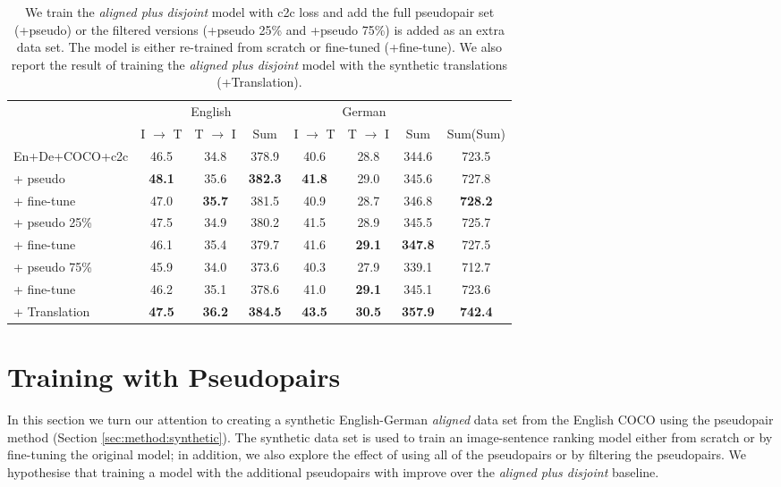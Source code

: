 \begin{table*}[ht]
    \centering
    \renewcommand{\arraystretch}{1.0}
    	\footnotesize
    \begin{tabular}{lccccccc}
        \toprule
         & \multicolumn{3}{c}{English}  & \multicolumn{3}{c}{German}\\
         \cmidrule(lr){2-4} \cmidrule(lr){5-7}
         & I $\rightarrow$ T & T $\rightarrow$ I & Sum 
         & I $\rightarrow$ T & T $\rightarrow$ I & Sum & Sum(Sum)\\
         \midrule
         En+De+COCO+c2c & 46.5 & 34.8 & 378.9 & 40.6 & 28.8 & 344.6 & 723.5\\
         \: \: + pseudo & \textbf{48.1}  & 35.6 & \textbf{382.3} & \textbf{41.8}  & 29.0  & 345.6 & 727.8 \\
          \: \: \: + fine-tune & 47.0 & \textbf{35.7}  & 381.5  & 40.9  & 28.7 & 346.8 & \textbf{728.2} \\
          \: \: + pseudo 25\% &  47.5  & 34.9 &  380.2 &  41.5 & 28.9 &  345.5 & 725.7\\
           \: \: \: + fine-tune &  46.1 & 35.4 &  379.7  &  41.6 & \textbf{29.1} & \textbf{347.8} & 727.5\\
          \: \: + pseudo 75\% &  45.9  & 34.0 & 373.6  & 40.3  & 27.9 &  339.1 & 712.7\\
          \: \: \: + fine-tune & 46.2  & 35.1 & 378.6  &  41.0 & \textbf{29.1}  &  345.1 & 723.6\\
          \hdashline
          \: + Translation & \textbf{47.5} & \textbf{36.2} & \textbf{384.5} & \textbf{43.5} & \textbf{30.5} & \textbf{357.9} & \textbf{742.4}\\
         \bottomrule
    \end{tabular}
    \caption{We train the \emph{aligned plus disjoint} model with 
    c2c loss and add the full pseudopair set (+pseudo) or the filtered versions (+pseudo 25\% and +pseudo 75\%) is added as an extra data set. The model is either re-trained from scratch or fine-tuned (+fine-tune). We also report the result of training the \emph{aligned plus disjoint} model with the synthetic translations (+Translation).}
    \label{tab:pseudoalignedplus}
\end{table*}

\section{Training with Pseudopairs}
\label{sec:pseudo}

In this section we turn our attention to creating a synthetic English-German \emph{aligned} data set from the English COCO using the pseudopair method (Section \ref{sec:method:synthetic}). The synthetic data set is used to train an image-sentence ranking model either from scratch or by fine-tuning the original model; in addition, we also explore the effect of using all of the pseudopairs or by filtering the pseudopairs. We hypothesise that training a model with the additional pseudopairs with improve over the \textit{aligned plus disjoint} baseline.

